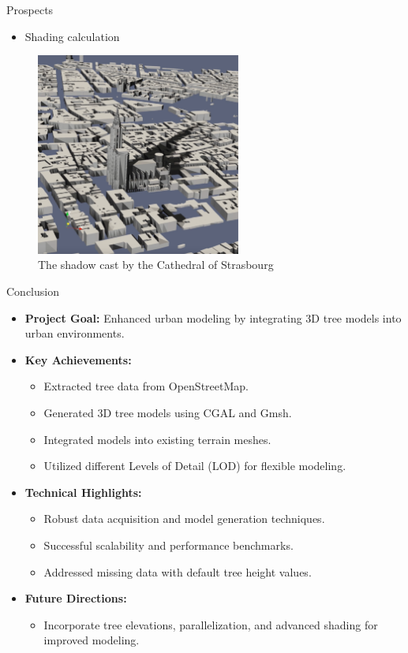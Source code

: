 \documentclass[10pt]{beamer}
\begin{document}
\begin{frame}{Prospects}
	\begin{itemize}
		\item Shading calculation
	\end{itemize}

	\begin{figure}
		\centering
		\includegraphics[width=0.6\textwidth]{images/cathedrale_shading.png}
		\caption{The shadow cast by the Cathedral of Strasbourg }
		\label{fig:figure1}
	\end{figure}
\end{frame}


\begin{frame}{Conclusion}
    \begin{itemize}
        \item \textbf{Project Goal:} Enhanced urban modeling by integrating 3D tree models into urban environments.
        \item \textbf{Key Achievements:}
        \begin{itemize}
            \item Extracted tree data from OpenStreetMap.
            \item Generated 3D tree models using CGAL and Gmsh.
            \item Integrated models into existing terrain meshes.
            \item Utilized different Levels of Detail (LOD) for flexible modeling.
        \end{itemize}
        \item \textbf{Technical Highlights:}
        \begin{itemize}
            \item Robust data acquisition and model generation techniques.
            \item Successful scalability and performance benchmarks.
            \item Addressed missing data with default tree height values.
        \end{itemize}
        \item \textbf{Future Directions:}
        \begin{itemize}
            \item Incorporate tree elevations, parallelization, and advanced shading for improved modeling.
        \end{itemize}
    \end{itemize}
\end{frame}
\end{document}
